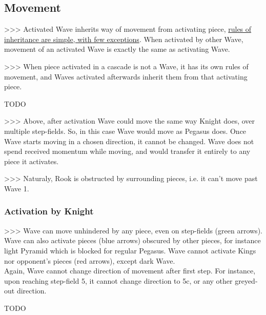 \subsection*{Movement}

\textgreater \textgreater \textgreater
Activated Wave inherits way of movement from activating piece,
\hyperref[sec:Appendix/Movement of Wave]{rules of inheritance are simple, with few exceptions}.
When activated by other Wave, movement of an activated Wave is exactly the same as
activating Wave.

\textgreater \textgreater \textgreater
When piece activated in a cascade is not a Wave, it has its own rules of movement, and
Waves activated afterwards inherit them from that activating piece.

\huge
TODO
\normalsize

\textgreater \textgreater \textgreater
Above, after activation Wave could move the same way Knight does, over multiple
step-fields. So, in this case Wave would move as Pegasus does. Once Wave starts
moving in a chosen direction, it cannot be changed. Wave does not spend received
momentum while moving, and would transfer it entirely to any piece it activates.

\textgreater \textgreater \textgreater
Naturaly, Rook is obstructed by surrounding pieces, i.e. it can't move past Wave 1.

\clearpage %

\subsubsection*{Activation by Knight}

\textgreater \textgreater \textgreater
Wave can move unhindered by any piece, even on step-fields (green arrows). Wave
can also activate pieces (blue arrows) obscured by other pieces, for instance
light Pyramid which is blocked for regular Pegasus. Wave cannot activate Kings
nor opponent's pieces (red arrows), except dark Wave. \\
Again, Wave cannot change direction of movement after first step. For instance,
upon reaching step-field 5, it cannot change direction to 5c, or any other
greyed-out direction.

\huge
TODO
\normalsize

